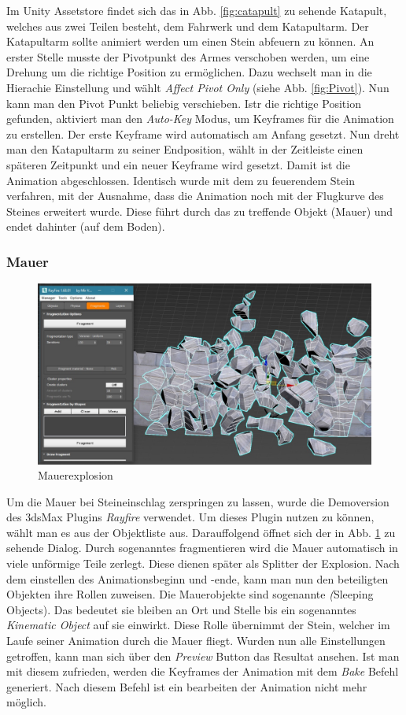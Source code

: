 Im Unity Assetstore findet sich das in Abb. \ref{fig:catapult} zu sehende Katapult, welches aus zwei Teilen besteht, dem Fahrwerk und dem Katapultarm. Der Katapultarm sollte animiert werden um einen Stein abfeuern zu können. An erster Stelle musste der Pivotpunkt des Armes verschoben werden, um eine Drehung um die richtige Position zu ermöglichen. Dazu wechselt man in die Hierachie Einstellung und wählt \textit{Affect Pivot Only} (siehe Abb. \ref{fig:Pivot}). Nun kann man den Pivot Punkt beliebig verschieben. Istr die richtige Position gefunden, aktiviert man den \textit{Auto-Key} Modus, um Keyframes für die Animation zu erstellen. Der erste Keyframe wird automatisch am Anfang gesetzt. Nun dreht man den Katapultarm zu seiner Endposition, wählt in der Zeitleiste einen späteren Zeitpunkt und ein neuer Keyframe wird gesetzt. Damit ist die Animation abgeschlossen. Identisch wurde mit dem zu feuerendem Stein verfahren, mit der Ausnahme, dass die Animation noch mit der Flugkurve des Steines erweitert wurde. Diese führt durch das zu treffende Objekt (Mauer) und endet dahinter (auf dem Boden).

\subsubsection{Mauer}
\begin{figure}[h]
	\centering
	\includegraphics[width=0.95 \linewidth]{Abbildungen/3dsMax/rayfire}
	\caption{Mauerexplosion}
	\label{fig:rayfire}
\end{figure}
Um die Mauer bei Steineinschlag zerspringen zu lassen, wurde die Demoversion des 3dsMax Plugins \textit{Rayfire} verwendet. Um dieses Plugin nutzen zu können, wählt man es aus der Objektliste aus. Darauffolgend öffnet sich der in Abb. \ref{fig:rayfire} zu sehende Dialog. Durch sogenanntes fragmentieren wird die Mauer automatisch in viele unförmige Teile zerlegt. Diese dienen später als Splitter der Explosion. Nach dem einstellen des Animationsbeginn und -ende, kann man nun den beteiligten Objekten ihre Rollen zuweisen. Die Mauerobjekte sind sogenannte \textit(Sleeping Objects). Das bedeutet sie bleiben an Ort und Stelle bis ein sogenanntes \textit{Kinematic Object} auf sie einwirkt. Diese Rolle übernimmt der Stein, welcher im Laufe seiner Animation durch die Mauer fliegt. Wurden nun alle Einstellungen getroffen, kann man sich über den \textit{Preview} Button das Resultat ansehen. Ist man mit diesem zufrieden, werden die Keyframes der Animation mit dem \textit{Bake} Befehl generiert. Nach diesem Befehl ist ein bearbeiten der Animation nicht mehr möglich.
 